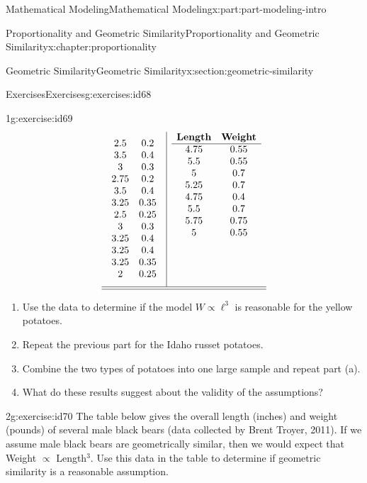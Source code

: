 \documentclass[oneside,10pt,]{book}
\numberwithin{equation}{section}
\begin{document}
\begin{partptx}{Mathematical Modeling}{}{Mathematical Modeling}{}{}{x:part:part-modeling-intro}
\begin{chapterptx}{Proportionality and Geometric Similarity}{}{Proportionality and Geometric Similarity}{}{}{x:chapter:proportionality}
\begin{sectionptx}{Geometric Similarity}{}{Geometric Similarity}{}{}{x:section:geometric-similarity}
\begin{exercises-subsection-numberless}{Exercises}{}{Exercises}{}{}{g:exercises:id68}
\begin{divisionexercise}{1}{}{}{g:exercise:id69}
\begin{equation*}
\begin{array}{c|c}
\begin{array}{cc}
2.5 & 0.2 \\
3.5 & 0.4 \\
3 & 0.3 \\
2.75 & 0.2 \\
3.5 & 0.4 \\
3.25 & 0.35 \\
2.5 & 0.25 \\
3 & 0.3 \\
3.25 & 0.4 \\
3.25 & 0.4 \\
3.25 & 0.35 \\
2 & 0.25
\end{array} & 
\begin{array}{cc}
\textbf{Length} & \textbf{Weight} \\\hline
4.75 & 0.55 \\
5.5 & 0.55 \\
5 & 0.7 \\
5.25 & 0.7 \\
4.75 & 0.4 \\
5.5 & 0.7 \\
5.75 & 0.75 \\
5 & 0.55 \\
& \\
& \\
& \\
& 
\end{array} \\\hline\hline
\end{array}
\end{equation*}
\begin{enumerate}[font=\bfseries,label=(\alph*),ref=\alph*]
\item{}Use the data to determine if the model \(W\propto \ell^3\) is reasonable for the yellow potatoes.%
\item{}Repeat the previous part for the Idaho russet potatoes.%
\item{}Combine the two types of potatoes into one large sample and repeat part (a).%
\item{}What do these results suggest about the validity of the assumptions?%
\end{enumerate}
\end{divisionexercise}%
\begin{divisionexercise}{2}{}{}{g:exercise:id70}%
The table below gives the overall length (inches) and weight (pounds) of several male black bears (data collected by Brent Troyer, 2011).  If we assume male black bears are geometrically similar, then we would expect that Weight \(\propto\) Length\({}^3\). Use this data in the table to determine if geometric similarity is a reasonable assumption.%

\end{divisionexercise}
\end{exercises-subsection-numberless}
\end{sectionptx}
\end{chapterptx}
\end{partptx}
\end{document}

